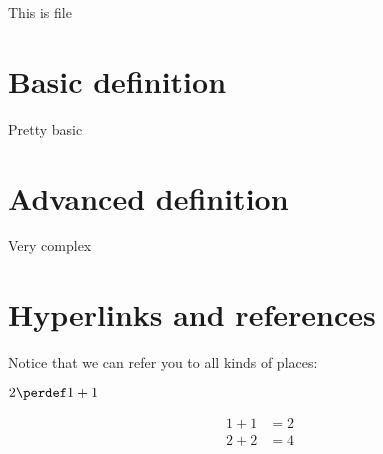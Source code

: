 \documentclass{ximera}
\begin{document}
    \author{Wim Obbels}
    \label{xim:references}


This is file \currfilename

\section{Basic definition}\label{sec:basicdefinition}

\begin{definition}\label{def:basicdefinition}
Pretty basic
\end{definition}

\section{Advanced definition}\label{sec:advanceddefinition}

\begin{definition}\label{def:advanceddefinition}
Very complex
\end{definition}


\section{Hyperlinks and references}\label{sec:hyperlinks}

Notice that we can refer you to all kinds of places: 
\begin{definition}\label{def:def1} $2 \perdef 1+1$
\end{definition}	

\begin{align}
 1 + 1 & = 2 \label{links_test1} \\
 2 + 2 & = 4 \label{links_test2}
\end{align}
\end{document}
